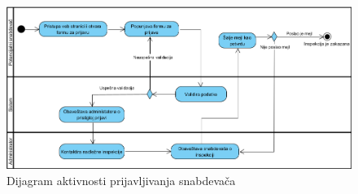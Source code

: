 \begin{figure}[H]
\begin{center}
\includegraphics[width=\textwidth]{Pictures/activity_supplier_application.png}
\end{center}
    \caption{Dijagram aktivnosti prijavljivanja snabdevača}
\label{fig:ActivitySupplierApplication}
\end{figure}